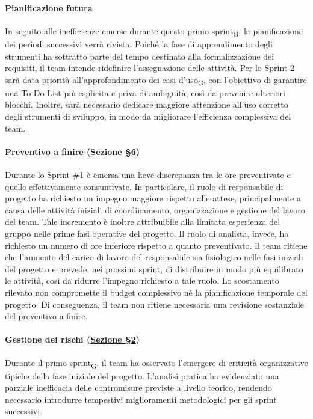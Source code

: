 \documentclass[a4paper, 10pt, colorlinks=true, linkcolor=black, urlcolor=blue, citecolor=blue, hidelinks]{article}
\begin{document}
\paragraph{Pianificazione futura}
In seguito alle inefficienze emerse durante questo primo sprint\textsubscript{G}, la pianificazione dei periodi successivi verrà rivista. Poiché la fase di apprendimento degli strumenti ha sottratto parte del tempo destinato alla formalizzazione dei requisiti, il team intende ridefinire l’assegnazione delle attività.
Per lo Sprint 2 sarà data priorità all'approfondimento dei casi d’uso\textsubscript{G}, con l’obiettivo di garantire una To-Do List più esplicita e priva di ambiguità, così da prevenire ulteriori blocchi. Inoltre, sarà necessario dedicare maggiore attenzione all’uso corretto degli strumenti di sviluppo, in modo da migliorare l’efficienza complessiva del team.
\paragraph{Preventivo a finire (\hyperref[tab:preventivo-finire]{Sezione \S6})}

Durante lo Sprint \#1 è emersa una lieve discrepanza
tra le ore preventivate e quelle effettivamente consuntivate.
In particolare, il ruolo di responsabile di progetto
ha richiesto un impegno maggiore rispetto alle attese,
principalmente a causa delle attività iniziali di coordinamento,
organizzazione e gestione del lavoro del team.
Tale incremento è inoltre attribuibile alla limitata esperienza
del gruppo nelle prime fasi operative del progetto.
Il ruolo di analista, invece, ha richiesto un numero di ore
inferiore rispetto a quanto preventivato.
Il team ritiene che l'aumento del carico di lavoro del responsabile
sia fisiologico nelle fasi iniziali del progetto e prevede,
nei prossimi sprint, di distribuire in modo più equilibrato
le attività, così da ridurre
l'impegno richiesto a tale ruolo.
Lo scostamento rilevato non compromette il budget complessivo
né la pianificazione temporale del progetto.
Di conseguenza, il team non ritiene necessaria
una revisione sostanziale del preventivo a finire.

\paragraph{Gestione dei rischi (\hyperref[tab:gestione-rischi]{Sezione \S2})}
Durante il primo sprint\textsubscript{G}, il team ha osservato l’emergere di criticità organizzative tipiche della fase iniziale del progetto. L’analisi pratica ha evidenziato una parziale inefficacia delle contromisure previste a livello teorico, rendendo necessario introdurre tempestivi miglioramenti metodologici per gli sprint successivi.
\end{document}
